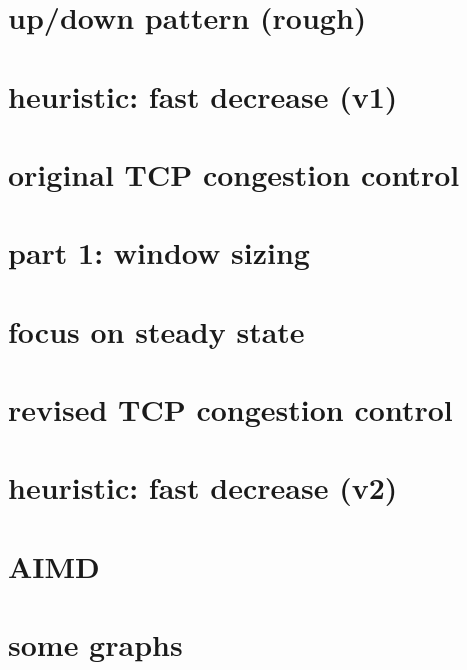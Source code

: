 \section{up/down pattern (rough)}


\section{heuristic: fast decrease (v1)}


\section{original TCP congestion control}



\section{part 1: window sizing}

\section{focus on steady state}


\section{revised TCP congestion control}


\section{heuristic: fast decrease (v2)}


\section{AIMD}



\section{some graphs}



